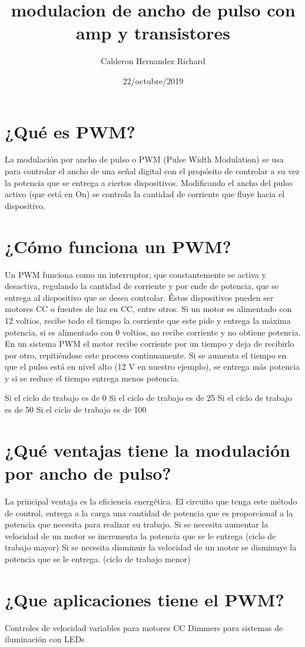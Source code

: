 \documentclass{article}
\title { modulacion de ancho de pulso con amp y transistores }
\author{Calderon Hernandez Richard}
\date{22/octubre/2019}
\begin{document}
\maketitle

\section{¿Qué es PWM?}
La modulación por ancho de pulso o PWM (Pulse Width Modulation) se usa para controlar el ancho de una señal digital con el propósito de controlar a su vez la potencia que se entrega a ciertos dispositivos. Modificando el ancho del pulso activo (que está en On) se controla la cantidad de corriente que fluye hacia el dispositivo.
\section{¿Cómo funciona un PWM?}
Un PWM funciona como un interruptor, que constantemente se activa y desactiva, regulando la cantidad de corriente y por ende de potencia, que se entrega al dispositivo que se desea controlar. Éstos dispositivos pueden ser motores CC o fuentes de luz en CC, entre otros.
Si un motor es alimentado con 12 voltios, recibe todo el tiempo la corriente que este pide y entrega la máxima potencia, si es alimentado con 0 voltios, no recibe corriente y no obtiene potencia.
En un sistema PWM el motor recibe corriente por un tiempo y deja de recibirlo por otro, repitiéndose este proceso continuamente. Si se aumenta el tiempo en que el pulso está en nivel alto (12 V en nuestro ejemplo), se entrega más potencia y si se reduce el tiempo entrega menos potencia.

Si el ciclo de trabajo es de 0%
Si el ciclo de trabajo es de 25%
Si el ciclo de trabajo es de 50%
Si el ciclo de trabajo es de 100%
\section{¿Qué ventajas tiene la modulación por ancho de pulso?}
La principal ventaja es la eficiencia energética. El circuito que tenga este método de control, entrega a la carga una cantidad de potencia que es proporcional a la potencia que necesita para realizar su trabajo.
Si se necesita aumentar la velocidad de un motor se incrementa la potencia que se le entrega (ciclo de trabajo mayor)
Si se necesita disminuir la velocidad de un motor se disminuye la potencia que se le entrega. (ciclo de trabajo menor)
\section{¿Que aplicaciones tiene el PWM?}
Controles de velocidad variables para motores CC
Dimmers para sistemas de iluminación con LEDs
\end{document}
